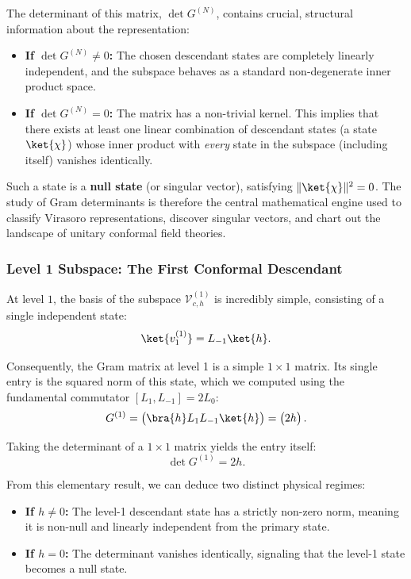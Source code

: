 The determinant of this matrix, \(\det G^{(N)}\), contains crucial, structural information about the representation:
\begin{itemize}
    \item \textbf{If \(\det G^{(N)} \neq 0\):} The chosen descendant states are completely linearly independent, and the subspace behaves as a standard non-degenerate inner product space.
    \item \textbf{If \(\det G^{(N)} = 0\):} The matrix has a non-trivial kernel. This implies that there exists at least one linear combination of descendant states (a state \(\ket{\chi}\)) whose inner product with \textit{every} state in the subspace (including itself) vanishes identically.
\end{itemize}

Such a state is a \textbf{null state} (or singular vector), satisfying \(\|\ket{\chi}\|^2 = 0\). The study of Gram determinants is therefore the central mathematical engine used to classify Virasoro representations, discover singular vectors, and chart out the landscape of unitary conformal field theories.

\subsubsection{Level 1 Subspace: The First Conformal Descendant}

At level \(1\), the basis of the subspace \(\mathcal{V}_{c,h}^{(1)}\) is incredibly simple, consisting of a single independent state:
\[
    \ket{v_1^{(1)}} = L_{-1}\ket{h}.
\]

Consequently, the Gram matrix at level 1 is a simple \(1 \times 1\) matrix. Its single entry is the squared norm of this state, which we computed using the fundamental commutator \([L_1, L_{-1}] = 2L_0\):
\[
    G^{(1)} = \begin{pmatrix} \bra{h} L_1 L_{-1} \ket{h} \end{pmatrix} = \begin{pmatrix} 2h \end{pmatrix}.
\]

Taking the determinant of a \(1 \times 1\) matrix yields the entry itself:
\[
    \det G^{(1)} = 2h.
\]

From this elementary result, we can deduce two distinct physical regimes:
\begin{itemize}
    \item \textbf{If \(h \neq 0\):} The level-1 descendant state has a strictly non-zero norm, meaning it is non-null and linearly independent from the primary state.
    \item \textbf{If \(h = 0\):} The determinant vanishes identically, signaling that the level-1 state becomes a null state.
\end{itemize}

